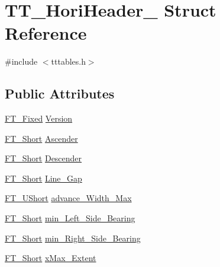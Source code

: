\hypertarget{struct_t_t___hori_header__}{}\section{T\+T\+\_\+\+Hori\+Header\+\_\+ Struct Reference}
\label{struct_t_t___hori_header__}


{\ttfamily \#include $<$tttables.\+h$>$}

\subsection*{Public Attributes}
\begin{DoxyCompactItemize}
\item 
\mbox{\hyperlink{fttypes_8h_a5f5a679cc09f758efdd0d1c5feed3c3d}{F\+T\+\_\+\+Fixed}} \mbox{\hyperlink{struct_t_t___hori_header___a2d0967448b63db392e35b566196fef97}{Version}}
\item 
\mbox{\hyperlink{fttypes_8h_aa7279be89046a2563cd3d4d6651fbdcf}{F\+T\+\_\+\+Short}} \mbox{\hyperlink{struct_t_t___hori_header___a6f987c89428c93854dab06e506134249}{Ascender}}
\item 
\mbox{\hyperlink{fttypes_8h_aa7279be89046a2563cd3d4d6651fbdcf}{F\+T\+\_\+\+Short}} \mbox{\hyperlink{struct_t_t___hori_header___ad5be55a98dfaa079a2aaa462034a1512}{Descender}}
\item 
\mbox{\hyperlink{fttypes_8h_aa7279be89046a2563cd3d4d6651fbdcf}{F\+T\+\_\+\+Short}} \mbox{\hyperlink{struct_t_t___hori_header___a4165055ed05e42a2e5eed805bfe3fd7d}{Line\+\_\+\+Gap}}
\item 
\mbox{\hyperlink{fttypes_8h_a937f6c17cf5ffd09086d8610c37b9f58}{F\+T\+\_\+\+U\+Short}} \mbox{\hyperlink{struct_t_t___hori_header___a1ddad7e4c5e6fed50c073745961814da}{advance\+\_\+\+Width\+\_\+\+Max}}
\item 
\mbox{\hyperlink{fttypes_8h_aa7279be89046a2563cd3d4d6651fbdcf}{F\+T\+\_\+\+Short}} \mbox{\hyperlink{struct_t_t___hori_header___a0e2e2bf8ca0e18b610c4eae0a647fded}{min\+\_\+\+Left\+\_\+\+Side\+\_\+\+Bearing}}
\item 
\mbox{\hyperlink{fttypes_8h_aa7279be89046a2563cd3d4d6651fbdcf}{F\+T\+\_\+\+Short}} \mbox{\hyperlink{struct_t_t___hori_header___a64144cdd595e8e8de119b78539bf2fa7}{min\+\_\+\+Right\+\_\+\+Side\+\_\+\+Bearing}}
\item 
\mbox{\hyperlink{fttypes_8h_aa7279be89046a2563cd3d4d6651fbdcf}{F\+T\+\_\+\+Short}} \mbox{\hyperlink{struct_t_t___hori_header___ab483cb323f9adc9d959209a42eb19957}{x\+Max\+\_\+\+Extent}}
\item 

\end{DoxyCompactItemize}
